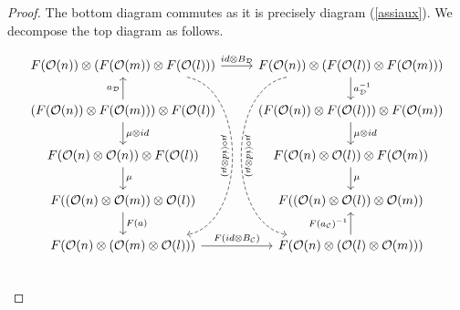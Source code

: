 \documentclass[Thesis.tex]{subfiles}
\begin{document}
\begin{proof}
   The bottom diagram commutes as it is precisely diagram (\ref{assiaux}). We decompose the top diagram as follows.
%   
   
   
      \[
\begin{tikzcd}[column sep = 2.5em]
 F(\OO(n))\otimes (F(\OO(m))\otimes F(\OO(l)))\arrow[r, "id\otimes B_\DD"] \arrow[dddd, dashed, bend left = 80, sloped, "\mu\circ (id\otimes\mu)"']& F(\OO(n))\otimes (F(\OO(l))\otimes F(\OO(m)))\arrow[d, "a_\DD^{-1}"]\arrow[dddd, dashed, bend right = 80, sloped, "\mu\circ (id\otimes\mu)"]\\
   (F(\OO(n))\otimes F(\OO(m)))\otimes F(\OO(l))\arrow[d, "\mu\otimes id"]\arrow[u, "a_\DD"]& (F(\OO(n))\otimes F(\OO(l)))\otimes F(\OO(m))\arrow[d, "\mu\otimes id"]\\
 F(\OO(n)\otimes\OO(n))\otimes F(\OO(l))\arrow[d, "\mu"] & F(\OO(n)\otimes \OO(l))\otimes F(\OO(m))\arrow[d, "\mu"]\\
 F((\OO(n)\otimes\OO(m))\otimes \OO(l))\arrow[d, "F(a)"] & F((\OO(n)\otimes\OO(l))\otimes\OO(m))\\
 F(\OO(n)\otimes (\OO(m)\otimes\OO(l)))\arrow[r,"F(id\otimes B_\CC)"] & F(\OO(n)\otimes (\OO(l)\otimes\OO(m)))\arrow[u, "F(a_\CC)^{-1}"]\\
\end{tikzcd}  
   \]
   

\end{proof}
\end{document}

